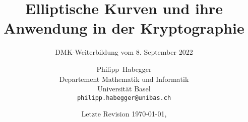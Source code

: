 \documentclass[a4paper,12pt,oneside]{scrbook}
\begin{document}
\title{Elliptische Kurven und ihre Anwendung in der Kryptographie}
\subtitle{DMK-Weiterbildung vom 8. September 2022}
\author{Philipp~Habegger \\ Departement Mathematik und Informatik
 \\ Universität Basel \\ \texttt{philipp.habegger@unibas.ch}}
\date{\small{Letzte Revision \today, \currenttime}}

\maketitle
\tableofcontents

\setcounter{chapter}{-1}










\vfill\hfill\texttt{}
\end{document}
